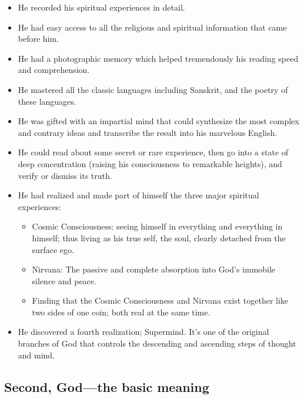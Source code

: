 \documentclass[12pt,a4paper]{book}
\begin{document}
\begin{itemize}
\renewcommand{\labelitemi}{$\diamond$}

\item He recorded his spiritual experiences in detail.

\item He had easy access to all the religious and spiritual
  information that came before him.

\item He had a photographic memory which helped tremendously his
  reading speed and comprehension.

\item He mastered all the classic languages including Sanskrit, and
  the poetry of these languages.

\item He was gifted with an impartial mind that could synthesize the
  most complex and contrary ideas and transcribe the result into his
  marvelous English.

\item He could read about some secret or rare experience, then go into
  a state of deep concentration (raising his consciousness to
  remarkable heights), and verify or dismiss its truth.

\item He had realized and made part of himself the three major
  spiritual experiences:

\begin{itemize}

\item Cosmic Consciousness: seeing himself in everything and
  everything in himself; thus living as his true self, the soul,
  clearly detached from the surface ego.

\item Nirvana: The passive and complete absorption into God's immobile
  silence and peace.

\item Finding that the Cosmic Consciousness and Nirvana exist together
  like two sides of one coin; both real at the same time.
\end{itemize}

\item He discovered a fourth realization; Supermind. It's one of the
  original branches of God that controls the descending and ascending
  steps of thought and mind.
\end{itemize}


\subsection*{Second, God---the basic meaning}
\end{document}
